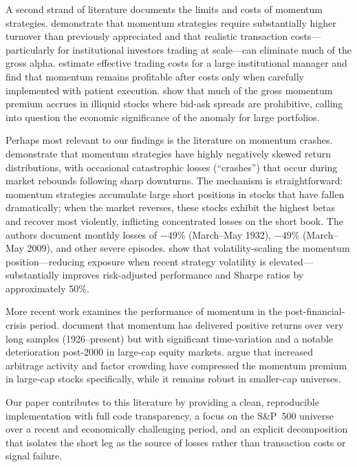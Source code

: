 \documentclass[11pt]{article}
\begin{document}
A second strand of literature documents the limits and costs of momentum strategies.
\citet{NovyMarx2016} demonstrate that momentum strategies require substantially higher
turnover than previously appreciated and that realistic transaction costs---particularly
for institutional investors trading at scale---can eliminate much of the gross alpha.
\citet{Frazzini2015} estimate effective trading costs for a large institutional manager
and find that momentum remains profitable after costs only when carefully implemented
with patient execution. \citet{Lesmond2004} show that much of the gross momentum premium
accrues in illiquid stocks where bid-ask spreads are prohibitive, calling into question
the economic significance of the anomaly for large portfolios.

Perhaps most relevant to our findings is the literature on momentum crashes.
\citet{Daniel2016} demonstrate that momentum strategies have highly negatively skewed
return distributions, with occasional catastrophic losses (``crashes'') that occur
during market rebounds following sharp downturns. The mechanism is straightforward:
momentum strategies accumulate large short positions in stocks that have fallen
dramatically; when the market reverses, these stocks exhibit the highest betas and
recover most violently, inflicting concentrated losses on the short book. The authors
document monthly losses of $-49\%$ (March--May 1932), $-49\%$ (March--May 2009), and
other severe episodes. \citet{Barroso2015} show that volatility-scaling the momentum
position---reducing exposure when recent strategy volatility is elevated---substantially
improves risk-adjusted performance and Sharpe ratios by approximately 50\%.

More recent work examines the performance of momentum in the post-financial-crisis
period. \citet{Asness2019} document that momentum has delivered positive returns over
very long samples (1926--present) but with significant time-variation and a notable
deterioration post-2000 in large-cap equity markets. \citet{Gulen2021} argue that
increased arbitrage activity and factor crowding have compressed the momentum premium
in large-cap stocks specifically, while it remains robust in smaller-cap universes.

Our paper contributes to this literature by providing a clean, reproducible implementation
with full code transparency, a focus on the S\&P~500 universe over a recent and economically
challenging period, and an explicit decomposition that isolates the short leg as the source
of losses rather than transaction costs or signal failure.
\end{document}
